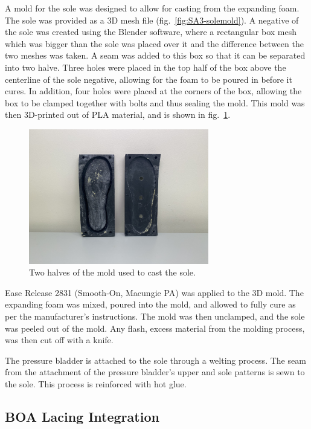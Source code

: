\documentclass[defaultstyle,11pt]{thesis}
\begin{document}
A mold for the sole was designed to allow for casting from the expanding foam.
The sole was provided as a 3D mesh file (fig.~\ref{fig:SA3-solemold}).
A negative of the sole was created using the Blender software, where a rectangular box mesh which was bigger than the sole was placed over it and the difference between the two meshes was taken.
A seam was added to this box so that it can be separated into two halve.
Three holes were placed in the top half of the box above the centerline of the sole negative, allowing for the foam to be poured in before it cures.
In addition, four holes were placed at the corners of the box, allowing the box to be clamped together with bolts and thus sealing the mold.
This mold was then 3D-printed out of PLA material, and is shown in fig.~\ref{fig:SA3-solemoldhalves}.

\begin{figure}
\hypertarget{fig:SA3-solemoldhalves}{%
\centering
\includegraphics[width=0.7\textwidth,height=\textheight]{../fig/SA3/Sole_Mold.jpg}
\caption{Two halves of the mold used to cast the sole.}\label{fig:SA3-solemoldhalves}
}
\end{figure}

Ease Release 2831 (Smooth-On, Macungie PA) was applied to the 3D mold.
The expanding foam was mixed, poured into the mold, and allowed to fully cure as per the manufacturer's instructions.
The mold was then unclamped, and the sole was peeled out of the mold.
Any flash, excess material from the molding process, was then cut off with a knife.

The pressure bladder is attached to the sole through a welting process.
The seam from the attachment of the pressure bladder's upper and sole patterns is sewn to the sole.
This process is reinforced with hot glue.

\hypertarget{boa-lacing-integration}{%
\subsection{BOA Lacing Integration}\label{boa-lacing-integration}}
\end{document}
